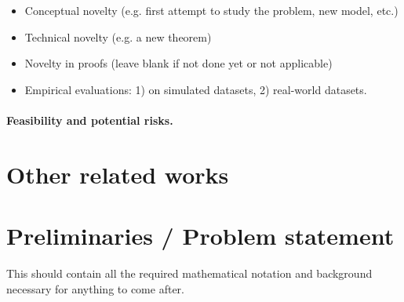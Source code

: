 \documentclass[11pt]{article}
\begin{document}
\begin{itemize} 

\item Conceptual novelty (e.g. first attempt to study the problem, new model, etc.)

\item Technical novelty (e.g. a new theorem)

\item Novelty in proofs (leave blank if not done yet or not applicable)

\item Empirical evaluations: 1) on simulated datasets, 2) real-world datasets.

\end{itemize}

\paragraph{Feasibility and potential risks.}


\section{Other related works}

\section{Preliminaries / Problem statement} 
This should contain all the required mathematical notation and background necessary for anything to come after.
\end{document}
